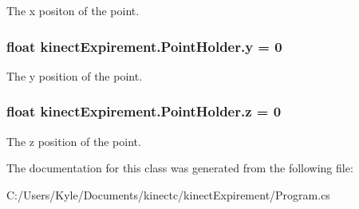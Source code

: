 The x positon of the point. 

\subsubsection[{\texorpdfstring{y}{y}}]{\setlength{\rightskip}{0pt plus 5cm}float kinect\+Expirement.\+Point\+Holder.\+y = 0}\hypertarget{classkinect_expirement_1_1_point_holder_a8e1920f1bd56b015aeae9f19a6f0c5e6}{}\label{classkinect_expirement_1_1_point_holder_a8e1920f1bd56b015aeae9f19a6f0c5e6}


The y position of the point. 

\subsubsection[{\texorpdfstring{z}{z}}]{\setlength{\rightskip}{0pt plus 5cm}float kinect\+Expirement.\+Point\+Holder.\+z = 0}\hypertarget{classkinect_expirement_1_1_point_holder_aa89b5a93efd8f6f6eb033ea7160c5d97}{}\label{classkinect_expirement_1_1_point_holder_aa89b5a93efd8f6f6eb033ea7160c5d97}


The z position of the point. 



The documentation for this class was generated from the following file\+:\begin{DoxyCompactItemize}
\item 
C\+:/\+Users/\+Kyle/\+Documents/kinectc/kinect\+Expirement/Program.\+cs\end{DoxyCompactItemize}
